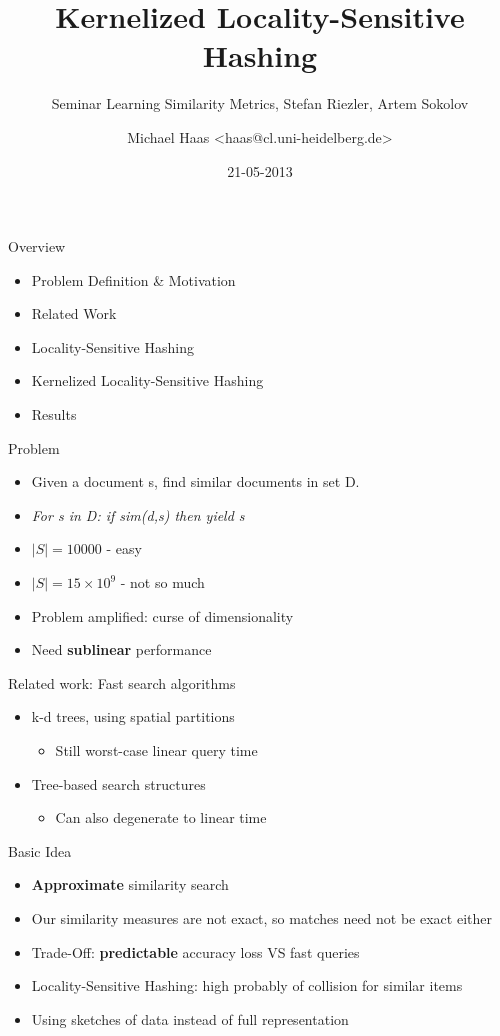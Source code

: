\documentclass[12pt,a4paper]{beamer}
\author{Michael Haas <haas@cl.uni-heidelberg.de>}
\title{Kernelized Locality-Sensitive Hashing}
\subtitle{Seminar Learning Similarity Metrics, Stefan Riezler, Artem Sokolov}
\date{21-05-2013}
\begin{document}
\begin{frame}
\maketitle
\end{frame}

\begin{frame}{Overview}
\begin{itemize}
\item Problem Definition \& Motivation
\item Related Work
\item Locality-Sensitive Hashing
\item Kernelized Locality-Sensitive Hashing
\item Results
\end{itemize}
\end{frame}

\begin{frame}{Problem}
\begin{itemize}
\item Given a document s, find similar documents in set D.
\item \textit{For s in D: if sim(d,s) then yield s}
\item $|S| = 10000$ - easy
\item $|S| = 15 \times 10^9$ - not so much
\item Problem amplified: curse of dimensionality
\item Need \textbf{sublinear} performance
\end{itemize}
\end{frame}

\begin{frame}{Related work: Fast search algorithms}
\begin{itemize}
\item k-d trees, using spatial partitions
    \begin{itemize}
    \item Still worst-case linear query time
    \end{itemize}
\item Tree-based search structures
    \begin{itemize}
    \item Can also degenerate to linear time
    \end{itemize}
\end{itemize}
\end{frame}

\begin{frame}{Basic Idea}
\begin{itemize}
\item \textbf{Approximate} similarity search
\item Our similarity measures are not exact, so matches need not be exact either
\item Trade-Off: \textbf{predictable} accuracy loss VS fast queries
\item Locality-Sensitive Hashing: high probably of collision for similar items
\item Using sketches of data instead of full representation
\end{itemize}
\end{frame}
\end{document}
